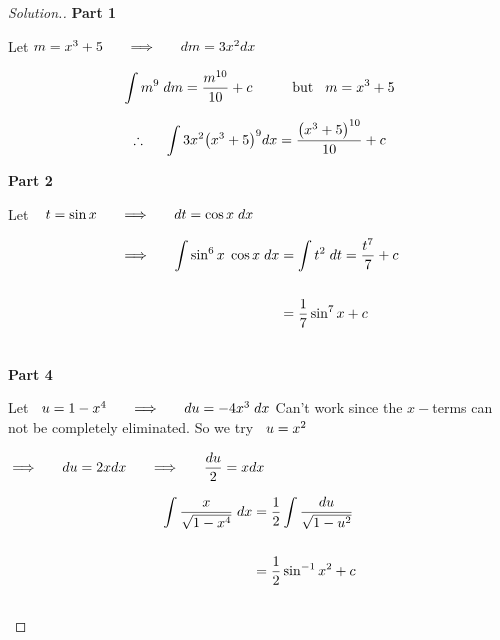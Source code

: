 \documentclass[11pt,a4paper]{article}
\theoremstyle{definition}
\newenvironment{solution}
  {\renewcommand{\qedsymbol}{}\begin{proof}[\textit{Solution}.]}
  {\end{proof}}
\newcommand{\subhead}[1]{%
  \par\medskip\noindent\textbf{#1}\par\nobreak\smallskip}
\begin{document}
\begin{solution}
\subhead{Part 1}
Let $m = x^3 + 5\hspace{0.5cm} \implies \hspace{0.5cm} dm  = 3x^2 dx$

$$\int m^9\hspace{0.1cm}dm = \dfrac{m^{10}}{10} + c\hspace{1cm} \text{but}\hspace{0.3cm} m = x^3 + 5$$

$$\therefore \hspace{0.5cm} \int 3x^2\big(x^3 + 5\big)^9dx = \dfrac{\big(x^3 + 5\big)^{10}}{10} + c$$

\subhead{Part 2}
Let $\hspace{0.3cm} t = \sin x \hspace{0.5cm} \implies\hspace{0.5cm} dt = \cos x\hspace{0.1cm}dx$

\begin{align*}
\implies\hspace{0.5cm}\int \sin^6x\hspace{0.1cm}\cos x \hspace{0.1cm}dx & = \int t^2 \hspace{0.1cm}dt = \frac{t^7}{7} + c\\\\
& = \dfrac{1}{7}\sin^7x + c\\\\
\end{align*}

\subhead{Part 4}
Let $\hspace{0.2cm}  u = 1 - x^4\hspace{0.5cm} \implies \hspace{0.5cm} du = -4x^3\hspace{0.1cm} dx$
Can't work since the $x-$terms can not be completely eliminated. So we try $\hspace{0.2cm}  u = x^2$

$\implies\hspace{0.5cm} du = 2xdx \hspace{0.5cm} \implies \hspace{0.5cm} \dfrac{du}{2} = xdx$

\begin{align*}
\int \dfrac{x}{\sqrt{1 - x^4}}\hspace{0.1cm}dx & = \dfrac{1}{2}\int \dfrac{du}{\sqrt{1 - u^2}}\\\\
& = \dfrac{1}{2}\sin^{-1} x^2 + c\\\\
\end{align*}
\end{solution}
\end{document}
